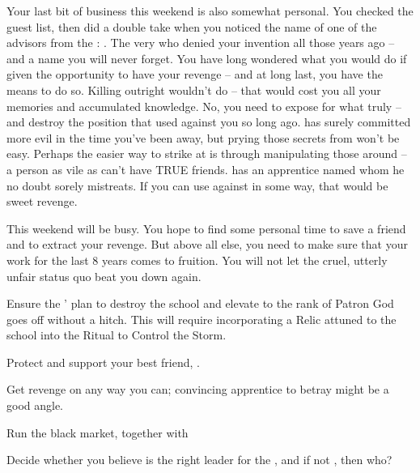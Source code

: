 \documentclass[char]{GL2020}
\begin{document}
Your last bit of business this weekend is also somewhat personal. You checked the guest list, then did a double take when you noticed the name of one of the advisors from the \pTech{}: \cAntiChup{\full}. The very \cAntiChup{\cleric} who denied your invention all those years ago -- and a name you will never forget. You have long wondered what you would do if given the opportunity to have your revenge -- and at long last, you have the means to do so. Killing \cAntiChup{} outright wouldn't do -- that would cost you all your memories and accumulated knowledge. No, you need to expose \cAntiChup{\them} for what \cAntiChup{\they} truly \cAntiChup{\are} -- and destroy the position that \cAntiChup{\they} used against you so long ago. \cAntiChup{} has surely committed more evil in the time you've been away, but prying those secrets from \cAntiChup{\them} won't be easy. Perhaps the easier way to strike at \cAntiChup{\them} is through manipulating those around \cAntiChup{\them} -- a person as vile as \cAntiChup{} can't have TRUE friends. \cAntiChup{} has an apprentice named \cScholarship{\full} whom he no doubt sorely mistreats. If you can use \cScholarship{\them} against \cAntiChup{\them} in some way, that would be sweet revenge.

This weekend will be busy. You hope to find some personal time to save a friend and to extract your revenge. But above all else, you need to make sure that your work for the last 8 years comes to fruition. You will not let the cruel, utterly unfair status quo beat you down again. 

\begin{itemz}
	\item Ensure the \pGoaties{}' plan to destroy the school and elevate \cGenesis{} to the rank of Patron God goes off without a hitch. This will require incorporating a Relic attuned to the school into the Ritual to Control the Storm.
	\item Protect and support your best friend, \cHeadScientist{}.
	\item Get revenge on \cAntiChup{} any way you can; convincing \cAntiChup{\their} apprentice \cScholarship{} to betray \cAntiChup{\them} might be a good angle.
	\item Run the black market, together with \cChupSecond{}
	\item Decide whether you believe \cChupLeader{} is the right leader for the \pGoaties{}, and if not \cChupLeader{\them}, then who?
\end{itemz}
\end{document}
